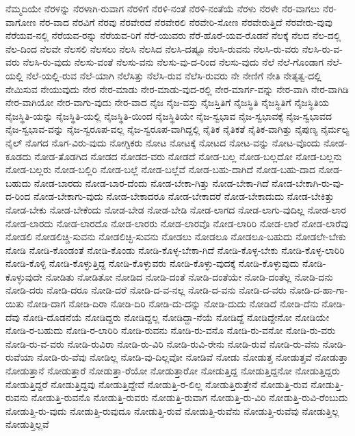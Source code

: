 {ನೆಮ್ಮದಿಯೇ
ನೆರಳನ್ನು
ನೆರಳಾಗಿ-ರುವಾಗ
ನೆರಳಿಗೆ
ನೆರಳಿ-ನಂತೆ
ನೆರಳಿ-ನಂತೆಯೆ
ನೆರಳು
ನೆರಳೇ
ನೆರ-ವಾಗಲು
ನೆರ-ವಾಗೋಣ
ನೆರ-ವಾದ
ನೆರವಿಗೆ
ನೆರವು
ನೆರವೇರದೆ
ನೆರವೇರಲಿ
ನೆರವೇರಿ-ಸೋಣ
ನೆರವೇರುತ್ತಿದೆ
ನೆರವೇರು-ವುವು
ನೆರೆಯವ-ನಲ್ಲಿ
ನೆರೆಯವ-ರನ್ನು
ನೆರೆಯವ-ರಿಗೆ
ನೆರೆ-ಯುವರು
ನೆರೆ-ಹೊರೆ-ಯವ-ರೊಡನೆ
ನೆಲಕ್ಕೆ
ನೆಲದ
ನೆಲ-ದಲ್ಲಿ
ನೆಲ-ದಿಂದ
ನೆಲವೇ
ನೆಲಸಲಿ
ನೆಲಸಲು
ನೆಲಸಿ
ನೆಲಸಿದ
ನೆಲಸಿ-ದಷ್ಟೂ
ನೆಲಸಿ-ರುವನು
ನೆಲಸಿ-ರು-ವರು
ನೆಲಸಿ-ರು-ವ-ವರು
ನೆಲಸಿ-ರು-ವುದು
ನೆಲಸು-ವಂತೆ
ನೆಲಸು-ವನು
ನೆಲಸು-ವು-ದ-ರಿಂದ
ನೆಲಸು-ವುದು
ನೆಲೆ
ನೆಲೆ-ಗೊಂಡಾಗ
ನೆಲೆ-ಯಲ್ಲಿ
ನೆಲೆ-ಯಲ್ಲಿ-ರುವ
ನೆಲೆ-ಯಾಗಿ
ನೆಲೆಸಿತ್ತು
ನೆಲೆಸಿ-ರುವ
ನೆಲೆಸಿ-ರುವರು
ನೇ
ನೇಣಿಗೆ
ನೇತಿ
ನೇತೃತ್ವ-ದಲ್ಲಿ
ನೇಮಿಸುವ
ನೇಯುವುದು
ನೇರ
ನೇರ-ಮಾಡು
ನೇರ-ಮಾಡು-ವುದ-ರಲ್ಲಿ
ನೇರ-ಮಾರ್ಗ-ವನ್ನು
ನೇರ-ವಾಗಿ
ನೇರ-ವಾಗಿಡಿ
ನೇರ-ವಾಗಿಯೋ
ನೇರ-ವಾಗು-ವುದು
ನೇರ-ವಾದ
ನೈಜ
ನೈಜ-ವಸ್ತು
ನೈಜಸ್ತಿತಿಗೆ
ನೈಜಸ್ಥಿತಿ
ನೈಜಸ್ಥಿತಿಗೆ
ನೈಜಸ್ಥಿತಿಯ
ನೈಜಸ್ಥಿತಿ-ಯನ್ನು
ನೈಜಸ್ಥಿತಿ-ಯಲ್ಲಿ
ನೈಜಸ್ಥಿತಿ-ಯಿಂದ
ನೈಜಸ್ಥಿತಿಯೇ
ನೈಜ-ಸ್ವಭಾವ
ನೈಜ-ಸ್ವಭಾವಕ್ಕೆ
ನೈಜ-ಸ್ವಭಾವದ
ನೈಜ-ಸ್ವಭಾವ-ವನ್ನು
ನೈಜ-ಸ್ವರೂಪ-ವಲ್ಲ
ನೈಜ-ಸ್ವರೂಪ-ವಾಗಿದ್ದಲ್ಲಿ
ನೈತಿಕ
ನೈತಿಕತೆ
ನೈತಿಕ-ವಾಗಿತ್ತು
ನೈಪುಣ್ಯ
ನೈರ್ಮಲ್ಯ
ನೈಲ್
ನೊಗದ
ನೊಗ-ವಿರು-ವುದು
ನೋಗ್ಟಿಕರು
ನೋಟ
ನೋಟಕ್ಕೆ
ನೋಟದ
ನೋಟ-ವನ್ನು
ನೋಟ-ವೊಂದು
ನೋಡ-ಕೂಡದು
ನೋಡ-ತೊಡಗಿದ
ನೋಡದ
ನೋಡದ-ವರು
ನೋಡದೆ
ನೋಡ-ಬಲ್ಲ
ನೋಡ-ಬಲ್ಲದೋ
ನೋಡ-ಬಲ್ಲನು
ನೋಡ-ಬಲ್ಲರು
ನೋಡ-ಬಲ್ಲಿರಿ
ನೋಡ-ಬಲ್ಲೆ
ನೋಡ-ಬಲ್ಲೆವೆ
ನೋಡ-ಬಹು-ದಾಗಿದೆ
ನೋಡ-ಬಹು-ದಾದ
ನೋಡ-ಬಹುದು
ನೋಡ-ಬಾರದು
ನೋಡ-ಬಾರ-ದೆಂದು
ನೋಡ-ಬೇಕಾ-ಗಿತ್ತು
ನೋಡ-ಬೇಕಾ-ಗಿದೆ
ನೋಡ-ಬೇಕಾಗಿ-ರು-ವು-ದ-ರಿಂದ
ನೋಡ-ಬೇಕಾಗು-ವುದು
ನೋಡ-ಬೇಕಾದರೂ
ನೋಡ-ಬೇಕಾದರೆ
ನೋಡ-ಬೇಕಾದುದು
ನೋಡ-ಬೇಕಿತ್ತು
ನೋಡ-ಬೇಕು
ನೋಡ-ಬೇಕೆಂದು
ನೋಡ-ಬೇಡ
ನೋಡ-ಬೇಡಿ
ನೋಡ-ಲಾಗದ
ನೋಡ-ಲಾಗು-ವುದಿಲ್ಲ
ನೋಡ-ಲಾರ
ನೋಡ-ಲಾರದು
ನೋಡ-ಲಾರದೊ
ನೋಡ-ಲಾರರು
ನೋಡ-ಲಾರವೊ
ನೋಡ-ಲಾರಿರಿ
ನೋಡ-ಲಾರೆ
ನೋಡ-ಲಾರೆವು
ನೋಡಲಿ
ನೋಡಲಿಚ್ಚಿ-ಸುವನು
ನೋಡಲಿಚ್ಛಿ-ಸುವನು
ನೋಡಲು
ನೋಡಲೂ
ನೋಡಲೂ-ಬಹುದು
ನೋಡಲೇ-ಬೇಕು
ನೋಡಿ
ನೋಡಿ-ಕೊಂಡಂತೆ
ನೋಡಿ-ಕೊಂಡು
ನೋಡಿ-ಕೊಳ್ಳ-ಬೇಕಾ-ಗಿದೆ
ನೋಡಿ-ಕೊಳ್ಳ-ಬೇಕು
ನೋಡಿ-ಕೊಳ್ಳ-ಲಾರಿರಿ
ನೋಡಿ-ಕೊಳ್ಳಿ
ನೋಡಿ-ಕೊಳ್ಳುತ್ತಿದ್ದ
ನೋಡಿ-ಕೊಳ್ಳುವರು
ನೋಡಿ-ಕೊಳ್ಳು-ವುದಕ್ಕೆ
ನೋಡಿ-ಕೊಳ್ಳುವುದು
ನೋಡಿ-ಕೊಳ್ಳುವುದೇ
ನೋಡಿತು
ನೋಡಿತೋ
ನೋಡಿದ
ನೋಡಿ-ದಂತೆ
ನೋಡಿ-ದಂತೆಯೇ
ನೋಡಿ-ದಂತೆಲ್ಲ
ನೋಡಿ-ದನು
ನೋಡಿ-ದರು
ನೋಡಿ-ದರೂ
ನೋಡಿ-ದರೆ
ನೋಡಿ-ದ-ವ-ನಲ್ಲ
ನೋಡಿ-ದ-ವನು
ನೋಡಿ-ದ-ವರು
ನೋಡಿ-ದ-ಹಾ-ಗಾ-ಯಿತು
ನೋಡಿ-ದಾಗ
ನೋಡಿ-ದಿರಾ
ನೋಡಿ-ದಿರಿ
ನೋಡಿ-ದು-ದನ್ನು
ನೋಡಿ-ದುದು
ನೋಡಿದೆ
ನೋಡಿ-ದೆನು
ನೋಡಿ-ದೆವು
ನೋಡಿ-ದೊಡನೆಯೆ
ನೋಡಿದ್ದರು
ನೋಡಿದ್ದಲ್ಲ
ನೋಡಿದ್ದಾ-ನೆಯೆ
ನೋಡಿದ್ದೆ
ನೋಡಿದ್ದೇನೋ
ನೋಡಿಯೇ
ನೋಡಿ-ರ-ಬಹುದು
ನೋಡಿ-ರ-ಲಾರಿರಿ
ನೋಡಿ-ರುವನು
ನೋಡಿ-ರು-ವನೊ
ನೋಡಿ-ರು-ವನೋ
ನೋಡಿ-ರು-ವರು
ನೋಡಿ-ರು-ವ-ವರು
ನೋಡಿ-ರುವಿರಾ
ನೋಡಿ-ರು-ವಿರಿ
ನೋಡಿ-ರುವಿ-ರೇನು
ನೋಡಿ-ರುವೆ
ನೋಡಿ-ರು-ವೆನು
ನೋಡಿ-ರುವೆಯಾ
ನೋಡಿ-ರು-ವೆವು
ನೋಡಿಲ್ಲ
ನೋಡಿ-ವು-ದಿಲ್ಲವೋ
ನೋಡಿವೆ
ನೋಡು
ನೋಡುತ್ತ
ನೋಡುತ್ತವೆ
ನೋಡುತ್ತಾ
ನೋಡುತ್ತಾನೆ
ನೋಡುತ್ತಾರೆ
ನೋಡುತ್ತಾ-ರೆಯೋ
ನೋಡುತ್ತಾರೋ
ನೋಡುತ್ತಿದ್ದ
ನೋಡುತ್ತಿದ್ದನೋ
ನೋಡುತ್ತಿದ್ದರು
ನೋಡುತ್ತಿದ್ದರೆ
ನೋಡುತ್ತಿದ್ದವು
ನೋಡುತ್ತಿದ್ದೇವೆ
ನೋಡುತ್ತಿ-ರ-ಲಿಲ್ಲ
ನೋಡುತ್ತಿರುತ್ತೇನೆ
ನೋಡುತ್ತಿ-ರುವ
ನೋಡುತ್ತಿ-ರುವನು
ನೋಡುತ್ತಿ-ರುವನೊ
ನೋಡುತ್ತಿ-ರುವರು
ನೋಡುತ್ತಿ-ರುವಾಗ
ನೋಡುತ್ತಿ-ರು-ವಿರಿ
ನೋಡುತ್ತಿ-ರುವಿ-ರೆಂಬುದು
ನೋಡುತ್ತಿ-ರು-ವುದು
ನೋಡುತ್ತಿ-ರುವುದೂ
ನೋಡುತ್ತಿ-ರುವೆ
ನೋಡುತ್ತಿ-ರುವೆನು
ನೋಡುತ್ತಿ-ರುವೆವು
ನೋಡುತ್ತಿಲ್ಲ
ನೋಡುತ್ತಿಲ್ಲವೆ
}
